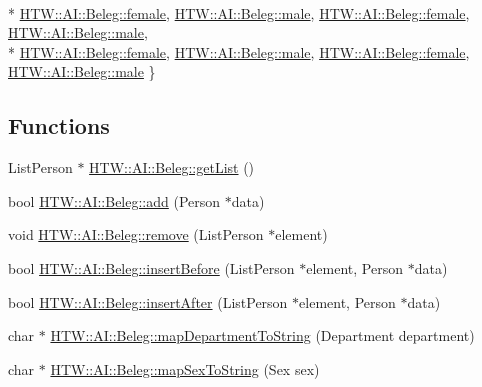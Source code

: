 \begin{DoxyCompactItemize}
\\*
\hyperlink{namespace_h_t_w_1_1_a_i_1_1_beleg_a79f3a46a934454a934cc7ec60d4f2e2ca818689f56a2a5ceab509322b9572679a}{H\-T\-W\-::\-A\-I\-::\-Beleg\-::female}, 
\hyperlink{namespace_h_t_w_1_1_a_i_1_1_beleg_a79f3a46a934454a934cc7ec60d4f2e2ca88c8052a9fd6b77c957e9d7048392450}{H\-T\-W\-::\-A\-I\-::\-Beleg\-::male}, 
\hyperlink{namespace_h_t_w_1_1_a_i_1_1_beleg_a79f3a46a934454a934cc7ec60d4f2e2ca818689f56a2a5ceab509322b9572679a}{H\-T\-W\-::\-A\-I\-::\-Beleg\-::female}, 
\hyperlink{namespace_h_t_w_1_1_a_i_1_1_beleg_a79f3a46a934454a934cc7ec60d4f2e2ca88c8052a9fd6b77c957e9d7048392450}{H\-T\-W\-::\-A\-I\-::\-Beleg\-::male}, 
\\*
\hyperlink{namespace_h_t_w_1_1_a_i_1_1_beleg_a79f3a46a934454a934cc7ec60d4f2e2ca818689f56a2a5ceab509322b9572679a}{H\-T\-W\-::\-A\-I\-::\-Beleg\-::female}, 
\hyperlink{namespace_h_t_w_1_1_a_i_1_1_beleg_a79f3a46a934454a934cc7ec60d4f2e2ca88c8052a9fd6b77c957e9d7048392450}{H\-T\-W\-::\-A\-I\-::\-Beleg\-::male}, 
\hyperlink{namespace_h_t_w_1_1_a_i_1_1_beleg_a79f3a46a934454a934cc7ec60d4f2e2ca818689f56a2a5ceab509322b9572679a}{H\-T\-W\-::\-A\-I\-::\-Beleg\-::female}, 
\hyperlink{namespace_h_t_w_1_1_a_i_1_1_beleg_a79f3a46a934454a934cc7ec60d4f2e2ca88c8052a9fd6b77c957e9d7048392450}{H\-T\-W\-::\-A\-I\-::\-Beleg\-::male}
 \}
\end{DoxyCompactItemize}
\subsection*{Functions}
\begin{DoxyCompactItemize}
\item 
List\-Person $\ast$ \hyperlink{namespace_h_t_w_1_1_a_i_1_1_beleg_a60ff115fb18a8cf3198fcaccec5e3201}{H\-T\-W\-::\-A\-I\-::\-Beleg\-::get\-List} ()
\item 
bool \hyperlink{namespace_h_t_w_1_1_a_i_1_1_beleg_af6ed0d1b191a944ce94086733b37953e}{H\-T\-W\-::\-A\-I\-::\-Beleg\-::add} (Person $\ast$data)
\item 
void \hyperlink{namespace_h_t_w_1_1_a_i_1_1_beleg_a89cbff7fbe68e50ec5b0995d936060c1}{H\-T\-W\-::\-A\-I\-::\-Beleg\-::remove} (List\-Person $\ast$element)
\item 
bool \hyperlink{namespace_h_t_w_1_1_a_i_1_1_beleg_a481e955551f92cf8b4a08f598eaae9f3}{H\-T\-W\-::\-A\-I\-::\-Beleg\-::insert\-Before} (List\-Person $\ast$element, Person $\ast$data)
\item 
bool \hyperlink{namespace_h_t_w_1_1_a_i_1_1_beleg_af8912e7f8d03efe279d299cce708ea9b}{H\-T\-W\-::\-A\-I\-::\-Beleg\-::insert\-After} (List\-Person $\ast$element, Person $\ast$data)
\item 
char $\ast$ \hyperlink{namespace_h_t_w_1_1_a_i_1_1_beleg_a71374c8885c328cc86695031048d6f3a}{H\-T\-W\-::\-A\-I\-::\-Beleg\-::map\-Department\-To\-String} (Department department)
\item 
char $\ast$ \hyperlink{namespace_h_t_w_1_1_a_i_1_1_beleg_aa88237c539d44af6b297104e90f3fe4a}{H\-T\-W\-::\-A\-I\-::\-Beleg\-::map\-Sex\-To\-String} (Sex sex)
\end{DoxyCompactItemize}
